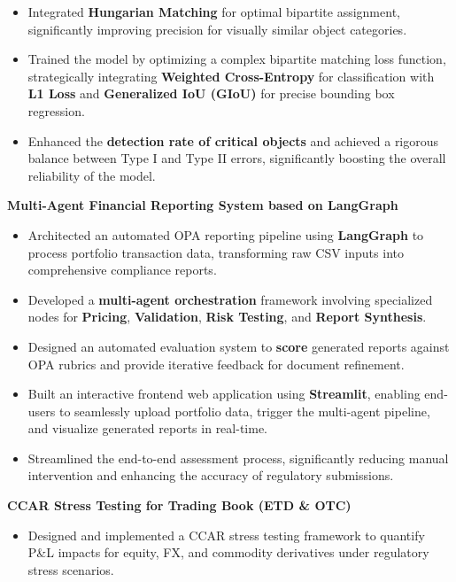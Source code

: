 \begin{cventries}
{\begin{cvitems}
\begin{itemize}
          \item {Integrated \textbf{Hungarian Matching} for optimal bipartite assignment, significantly improving precision for visually similar object categories.}
          \item {Trained the model by optimizing a complex bipartite matching loss function, strategically integrating \textbf{Weighted Cross-Entropy} for classification with \textbf{L1 Loss} and \textbf{Generalized IoU (GIoU)} for precise bounding box regression.}
          \item {Enhanced the \textbf{detection rate of critical objects} and achieved a rigorous balance between Type I and Type II errors, significantly boosting the overall reliability of the model.}
        \end{itemize}
      \vspace{0.5mm}
      \item {\textbf{Multi-Agent Financial Reporting System based on LangGraph}}
        \begin{itemize}
          \item {Architected an automated OPA reporting pipeline using \textbf{LangGraph} to process portfolio transaction data, transforming raw CSV inputs into comprehensive compliance reports.}
          \item {Developed a \textbf{multi-agent orchestration} framework involving specialized nodes for \textbf{Pricing}, \textbf{Validation}, \textbf{Risk Testing}, and \textbf{Report Synthesis}.}
          \item {Designed an automated evaluation system to \textbf{score} generated reports against OPA rubrics and provide iterative feedback for document refinement.}
          \item {Built an interactive frontend web application using \textbf{Streamlit}, enabling end-users to seamlessly upload portfolio data, trigger the multi-agent pipeline, and visualize generated reports in real-time.}
          \item {Streamlined the end-to-end assessment process, significantly reducing manual intervention and enhancing the accuracy of regulatory submissions.}
        \end{itemize}
      \vspace{0.5mm}
      \item {\textbf{CCAR Stress Testing for Trading Book (ETD \& OTC)}}
        \begin{itemize}
          \item Designed and implemented a CCAR stress testing framework to quantify P\&L impacts for {equity, FX, and commodity} derivatives under regulatory stress scenarios.

\end{itemize}
\end{cvitems}}
\end{cventries}
